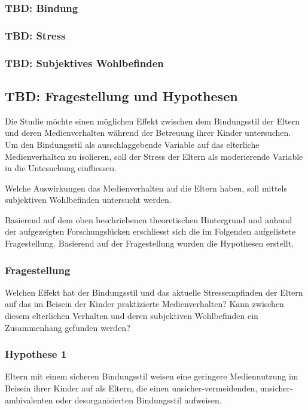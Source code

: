 \subsubsection{TBD: Bindung}\label{sec:Bindung}

\subsubsection{TBD: Stress}\label{sec:Stress}

\subsubsection{TBD: Subjektives Wohlbefinden}\label{sec:Swb}






\subsection{TBD: Fragestellung und Hypothesen} \label{sec:Fragestellung}
Die Studie möchte einen möglichen Effekt zwischen dem Bindungsstil der Eltern und deren Medienverhalten während der Betreuung ihrer Kinder untersuchen. Um den Bindungsstil als ausschlaggebende Variable auf das elterliche Medienverhalten zu isolieren, soll der Stress der Eltern als moderierende Variable in die Untesuchung einfliessen.

Welche Auswirkungen das Medienverhalten auf die Eltern haben, soll mittels subjektiven Wohlbefinden  untersucht werden. 

Basierend auf dem oben beschriebenen theoretischen Hintergrund und anhand der aufgezeigten Forschungslücken erschliesst sich die im Folgenden aufgelistete Fragestellung. Basierend auf der Fragestellung wurden die Hypothesen erstellt.
\subsubsection{Fragestellung} 
Welchen Effekt hat der Bindungsstil und das aktuelle Stressempfinden der Eltern auf das im Beisein der Kinder praktizierte Medienverhalten? Kann zwischen diesem elterlichen Verhalten und deren subjektiven Wohlbefinden ein Zusammenhang gefunden werden?
\subsubsection{Hypothese 1}
Eltern mit einem sicheren Bindungsstil weisen eine geringere Mediennutzung im Beisein ihrer Kinder auf als Eltern, die einen unsicher-vermeidenden, unsicher-ambivalenten oder desorganisierten Bindungsstil aufweisen.
